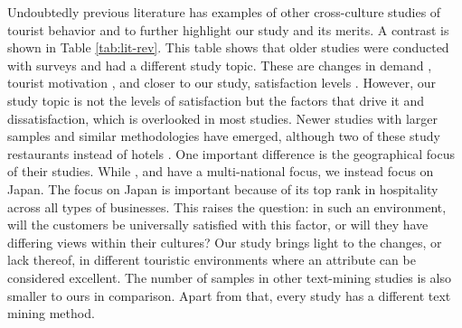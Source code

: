 \documentclass[smallextended,natbib]{svjour3}       %
\begin{document}
    Undoubtedly previous literature has examples of other cross-culture studies of tourist behavior and to further highlight our study and its merits. A contrast is shown in Table \ref{tab:lit-rev}. This table shows that older studies were conducted with surveys and had a different study topic. These are changes in demand \cite[][]{bauer1993changing}, tourist motivation \cite[][]{kim2000}, and closer to our study, satisfaction levels \cite[][]{choi2000}. However, our study topic is not the levels of satisfaction but the factors that drive it and dissatisfaction, which is overlooked in most studies. Newer studies with larger samples and similar methodologies have emerged, although two of these study restaurants instead of hotels \cite[][]{JIA2020104071, HUANG2017117}. One important difference is the geographical focus of their studies. While \cite{FRANCESCO201924} , \cite{JIA2020104071} and \cite{HUANG2017117} have a multi-national focus, we instead focus on Japan. The focus on Japan is important because of its top rank in hospitality across all types of businesses. This raises the question: in such an environment, will the customers be universally satisfied with this factor, or will they have differing views within their cultures? Our study brings light to the changes, or lack thereof, in different touristic environments where an attribute can be considered excellent. The number of samples in other text-mining studies is also smaller to ours in comparison. Apart from that, every study has a different text mining method.
\end{document}
